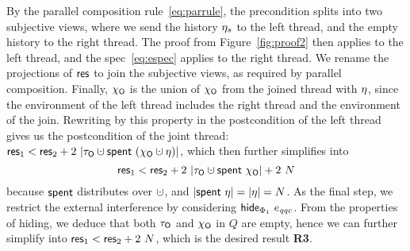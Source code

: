%
By the parallel composition rule~\eqref{eq:parrule}, the precondition
splits into two subjective views, where we send the history $\eta_s$
to the left thread, and the empty history to the right thread. The
proof from Figure~\ref{fig:proof2} then applies to the left thread, and
the spec~\eqref{eq:espec} applies to the right thread. We rename the
projections of $\mathsf{res}$ to join the subjective views, as required by
parallel composition. Finally, $\chi_{\mathsf{O}}$ is the union of $\chi_{\mathsf{O}}$ from
the joined thread with $\eta$, since the environment of the left
thread includes the right thread and the environment of the
join. Rewriting by this property in the postcondition of the left
thread gives us the postcondition of the joint thread: $\res_1 < \res_2
+2\ |\tkno \hunion \Tomb~(\histo \hunion \gist)|$, which then further simplifies
into
\[
\res_1 < \res_2 + 2\ |\tkno \hunion \Tomb~\histo| + 2\ N
\]
because $\mathsf{spent}$ distributes over $\hunion$, and $|\mathsf{spent}~\eta| =
|\eta| = N$. As the final step, we restrict the external interference
by considering $\mathsf{hide}_{\Phi_1}~e_{\mathit{qqc}}$. From the properties of hiding,
we deduce that both $\tau_{\mathsf{O}}$ and $\chi_{\mathsf{O}}$ in $Q$ are empty, hence we
can further simplify into $\mathsf{res}_1 < \mathsf{res}_2 + 2 \ N$, which is the
desired result \textbf{R3}.
